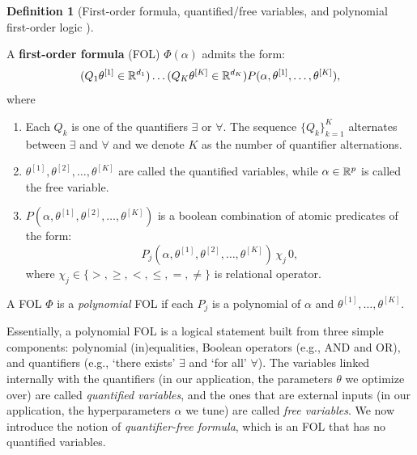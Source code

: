 \documentclass{article}
\theoremstyle{plain}
\theoremstyle{definition}
\newtheorem{definition}[theorem]{Definition}
\theoremstyle{remark}
\begin{document}
    
\begin{definition}[First-order formula, quantified/free variables, and polynomial first-order logic \cite{renegar1992computational}] \label{def:first-order-formula}

    A \textbf{first-order formula} (FOL) $\Phi(\alpha)$ admits the form:
    \begin{equation} \label{eq:FOL}
        (Q_1 \theta^{[1]} \in \mathbb{R}^{d_1}) \ldots (Q_K \theta^{[K]} \in \mathbb{R}^{d_K}) P(\alpha, \theta^{[1]}, \ldots, \theta^{[K]}),
    \end{equation}
    where
    \begin{enumerate}[leftmargin=*]
        \item Each $Q_k$ is one of the quantifiers $\exists$ or $\forall$. The sequence $\{Q_k\}_{k = 1}^K$ alternates between $\exists$ and $\forall$ and we denote $K$ as the number of quantifier alternations.
        
        \item $\theta^{[1]}, \theta^{[2]}, \ldots, \theta^{[K]}$ are called the quantified variables, while $\alpha \in \mathbb{R}^p$ is called the free variable.
        
        \item $P(\alpha, \theta^{[1]}, \theta^{[2]}, \ldots, \theta^{[K]})$ is a boolean combination of atomic predicates of the form:
        \begin{equation*}
            P_j(\alpha, \theta^{[1]}, \theta^{[2]}, \ldots, \theta^{[K]}) \, \chi_j \, 0,
        \end{equation*}
        where $\chi_j \in \{>, \geq, <, \leq, =, \neq\}$ is relational operator.
    \end{enumerate}
    A FOL $\Phi$ is a \emph{polynomial} FOL if each $P_j$ is a polynomial of $\alpha$ and $\theta^{[1]}, \dots, \theta^{[K]}$.
\end{definition}

Essentially, a polynomial FOL is a logical statement built from three simple components: polynomial (in)equalities, Boolean operators (e.g., AND and OR), and quantifiers (e.g., `there exists' $\exists$ and `for all' $\forall$). The variables linked internally with the quantifiers (in our application, the parameters $\theta$ we optimize over) are called \textit{quantified variables}, and the ones that are external inputs (in our application, the hyperparameters $\alpha$ we tune) are called \textit{free variables}. We now introduce the notion of \textit{quantifier-free formula}, which is an FOL that has no quantified variables. 
\end{document}
